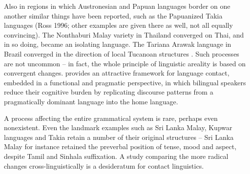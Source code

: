 Also in regions in which Austronesian and Papuan languages border on one another similar things have been reported, such as the Papuanized Takia languages (Ross 1996; other examples are given there as well, not all equally convincing). The Nonthaburi Malay variety in Thailand \citep{Tadmor1992,Tadmor1995,Tadmor2004} converged on Thai, and in so doing, became an isolating language. The Tariana Arawak language in Brazil converged in the direction of local Tucanoan structures \citep{Aikhenvald2002,Aikhenvald2003}. Such processes are not uncommon -- in fact, the whole principle of linguistic areality is based on convergent changes. \citet{Matras2009} provides an attractive framework for language contact, embedded in a functional and pragmatic perspective, in which bilingual speakers reduce their cognitive burden by replicating discourse patterns from a pragmatically dominant language into the home language.

A process affecting the entire grammatical system is rare, perhaps even nonexistent. Even the landmark examples such as Sri Lanka Malay, Kupwar languages and Takia retain a number of their original structures -- Sri Lanka Malay for instance retained the preverbal position of tense, mood and aspect, despite Tamil and Sinhala suffixation. A study comparing the more radical changes cross-linguistically is a desideratum for contact linguistics. 

